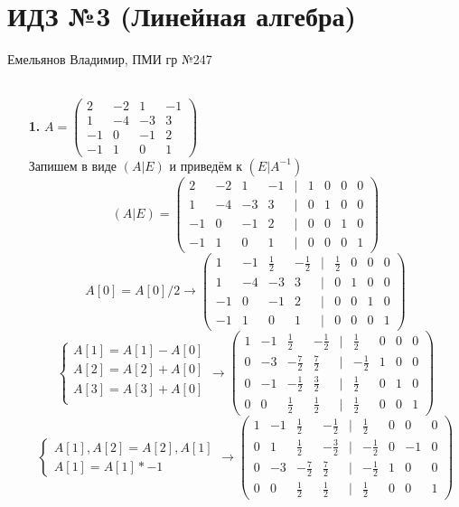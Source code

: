 \documentclass[a4paper]{article}
\newcommand{\mat}[1]{\begin{pmatrix} #1 \end{pmatrix}}
\newcommand{\case}[1]{\begin{cases} #1 \end{cases}}
\begin{document}
\section*{ИДЗ №3 (Линейная алгебра)}
 {\large Емельянов Владимир, ПМИ гр №247}\\\\
\begin{enumerate}
    \item[\textbf{1.}]
    $A = \mat{2 & -2 & 1 & -1 \\ 1 & -4 & -3 & 3 \\ -1 & 0 & -1 & 2 \\ -1 & 1 & 0 & 1}$\\
    Запишем в виде $(A|E)$ и приведём к $(E|A^{-1})$
    $$(A|E) = \mat{2 & -2 & 1 & -1 & | & 1 & 0 & 0 & 0\\ 1 & -4 & -3 & 3 & | & 0 & 1 & 0 & 0\\ -1 & 0 & -1 & 2 & | & 0 & 0 & 1 & 0 \\ -1 & 1 & 0 & 1 & | & 0 & 0 & 0 & 1} $$
    $$A[0] = A[0]/2 \to \mat{1 & -1 & \frac{1}{2} & -\frac{1}{2} & | & \frac{1}{2} & 0 & 0 & 0 \\ 1 & -4 & -3 & 3 & | & 0 & 1 & 0 & 0 \\ -1 & 0 & -1 & 2 & | & 0 & 0 & 1 & 0 \\ -1 & 1 & 0 & 1 & | & 0 & 0 & 0 & 1}$$
    $$\case{A[1] = A[1]-A[0]\\
    A[2] = A[2]+A[0]\\
    A[3] = A[3]+A[0]\\} \to \mat{1 & -1 & \frac{1}{2} & -\frac{1}{2} & | & \frac{1}{2} & 0 & 0 & 0 \\ 0 & -3 & -\frac{7}{2} & \frac{7}{2} & | & -\frac{1}{2} & 1 & 0 & 0 \\ 0 & -1 & -\frac{1}{2} & \frac{3}{2} & | & \frac{1}{2} & 0 & 1 & 0 \\ 0 & 0 & \frac{1}{2} & \frac{1}{2} & | & \frac{1}{2} & 0 & 0 & 1}$$
    $$\case{
        A[1], A[2] = A[2], A[1] \\
        A[1] = A[1]*-1} \to \mat{1 & -1 & \frac{1}{2} & -\frac{1}{2} & | & \frac{1}{2} & 0 & 0 & 0 \\ 0 & 1 & \frac{1}{2} & -\frac{3}{2} & | & -\frac{1}{2} & 0 & -1 & 0 \\ 0 & -3 & -\frac{7}{2} & \frac{7}{2} & | & -\frac{1}{2} & 1 & 0 & 0 \\ 0 & 0 & \frac{1}{2} & \frac{1}{2} & | & \frac{1}{2} & 0 & 0 & 1}$$


\end{enumerate}
\end{document}
